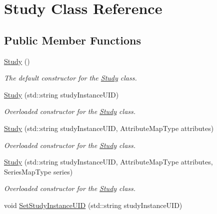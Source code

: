 \hypertarget{class_study}{
\section{Study Class Reference}
\label{class_study}
}
\subsection*{Public Member Functions}
\begin{DoxyCompactItemize}
\item 
\hypertarget{class_study_a0ca2ff6c5edc00f78b8be3ffb8fa73ea}{
\hyperlink{class_study_a0ca2ff6c5edc00f78b8be3ffb8fa73ea}{Study} ()}
\label{class_study_a0ca2ff6c5edc00f78b8be3ffb8fa73ea}

\begin{DoxyCompactList}\small\item\em The default constructor for the \hyperlink{class_study}{Study} class. \item\end{DoxyCompactList}\item 
\hyperlink{class_study_ae350a639ded16eb47a2858244ef4da59}{Study} (std::string studyInstanceUID)
\begin{DoxyCompactList}\small\item\em Overloaded constructor for the \hyperlink{class_study}{Study} class. \item\end{DoxyCompactList}\item 
\hyperlink{class_study_a99e20c7b346b2ac4a8af41200aea3706}{Study} (std::string studyInstanceUID, AttributeMapType attributes)
\begin{DoxyCompactList}\small\item\em Overloaded constructor for the \hyperlink{class_study}{Study} class. \item\end{DoxyCompactList}\item 
\hyperlink{class_study_abed05c1c4c501f4d338d10002bc6e2cf}{Study} (std::string studyInstanceUID, AttributeMapType attributes, SeriesMapType series)
\begin{DoxyCompactList}\small\item\em Overloaded constructor for the \hyperlink{class_study}{Study} class. \item\end{DoxyCompactList}\item 
void \hyperlink{class_study_a54fe32603906f9739067aa2dc1c0cd3c}{SetStudyInstanceUID} (std::string studyInstanceUID)

\end{DoxyCompactItemize}
